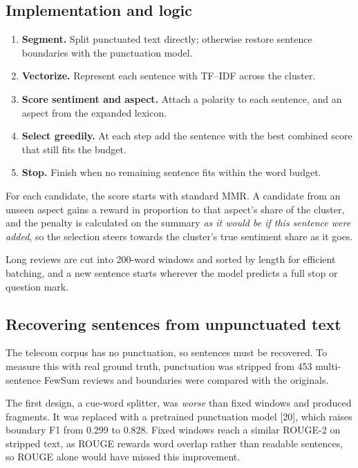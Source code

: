 \documentclass[11pt,a4paper]{article}
\newcommand{\T}[1]{}
\newcommand{\codefile}[3]{\par\vspace{0pt plus 3.5cm}\penalty-100\vspace{0pt plus -3.5cm}}
\begin{document}
\subsection{Implementation and logic}
\begin{enumerate}
\item \textbf{Segment.} Split punctuated text directly; otherwise restore sentence boundaries with the punctuation model.
\item \textbf{Vectorize.} Represent each sentence with TF--IDF across the cluster.
\item \textbf{Score sentiment and aspect.} Attach a polarity to each sentence, and an aspect from the expanded lexicon.
\item \textbf{Select greedily.} At each step add the sentence with the best combined score that still fits the budget.
\item \textbf{Stop.} Finish when no remaining sentence fits within the word budget.
\end{enumerate}
\codefile{pab_mmr}{PAB-MMR greedy selection}{summarize.py}
For each candidate, the score starts with standard MMR. A candidate from an unseen aspect gains a reward in proportion to that aspect's share of the cluster, and the penalty is calculated on the summary \emph{as it would be if this sentence were added}, so the selection steers towards the cluster's true sentiment share as it goes.
\codefile{segment_many}{Sentence recovery with the punctuation model}{punctuate.py}
Long reviews are cut into 200-word windows and sorted by length for efficient batching, and a new sentence starts wherever the model predicts a full stop or question mark.
\codefile{expand_aspects}{Aspect lexicon expansion with PA-W2V neighbours}{summarize.py}

\subsection{Recovering sentences from unpunctuated text}
The telecom corpus has no punctuation, so sentences must be recovered. To measure this with real ground truth, punctuation was stripped from 453 multi-sentence FewSum reviews and boundaries were compared with the originals.
\T{sum_seg}
The first design, a cue-word splitter, was \emph{worse} than fixed windows and produced fragments. It was replaced with a pretrained punctuation model [20], which raises boundary F1 from 0.299 to 0.828. Fixed windows reach a similar ROUGE-2 on stripped text, as ROUGE rewards word overlap rather than readable sentences, so ROUGE alone would have missed this improvement.
\end{document}
